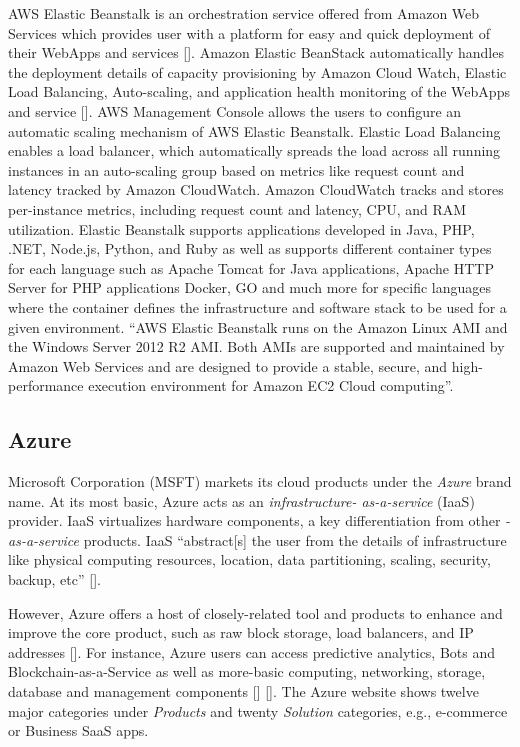 AWS Elastic Beanstalk is an orchestration service offered from Amazon
Web Services which provides user with a platform for easy and quick
deployment of their WebApps and
services [\cite{www-amazon-elastic-beanstalk}]. Amazon Elastic BeanStack
automatically handles the deployment details of capacity provisioning
by Amazon Cloud Watch, Elastic Load Balancing, Auto-scaling, and
application health monitoring of the WebApps and
service [\cite{amazon-elastic-beanstalk-book}]. AWS Management Console
allows the users to configure an automatic scaling mechanism of AWS
Elastic Beanstalk. Elastic Load Balancing enables a load balancer,
which automatically spreads the load across all running instances in
an auto-scaling group based on metrics like request count and latency
tracked by Amazon CloudWatch. Amazon CloudWatch tracks and stores
per-instance metrics, including request count and latency, CPU, and
RAM utilization. Elastic Beanstalk supports applications developed in
Java, PHP, .NET, Node.js, Python, and Ruby as well as supports
different container types for each language such as Apache Tomcat for
Java applications, Apache HTTP Server for PHP applications Docker, GO
and much more for specific languages where the container defines the
infrastructure and software stack to be used for a given
environment. ``AWS Elastic Beanstalk runs on the Amazon Linux AMI and
the Windows Server 2012 R2 AMI. Both AMIs are supported and maintained
by Amazon Web Services and are designed to provide a stable, secure,
and high-performance execution environment for Amazon EC2 Cloud
computing''\cite{www-amazon-elastic-beanstalk}.

\subsection{Azure}

Microsoft Corporation (MSFT) markets its cloud products under the
\textit{Azure} brand name. At its most basic, Azure acts as an
\textit{infrastructure- as-a-service} (IaaS) provider.  IaaS virtualizes
hardware components, a key differentiation from other \textit{-as-a-service}
products. IaaS ``abstract[s] the user from the details of
infrastructure like physical computing resources, location, data
partitioning, scaling, security, backup,
etc'' [\cite{www-wikipedia-cloud}].

However, Azure offers a host of closely-related tool and products to
enhance and improve the core product, such as raw block storage, load
balancers, and IP addresses [\cite{www-azure-msft}]. For instance, Azure
users can access predictive analytics, Bots and
Blockchain-as-a-Service as well as more-basic computing, networking,
storage, database and management
components [\cite{www-sec-edgar-msft}] [\cite{www-azure-msft}].  The Azure
website shows twelve major categories under \textit{Products} and twenty
\textit{Solution} categories, e.g., e-commerce or Business SaaS apps.

